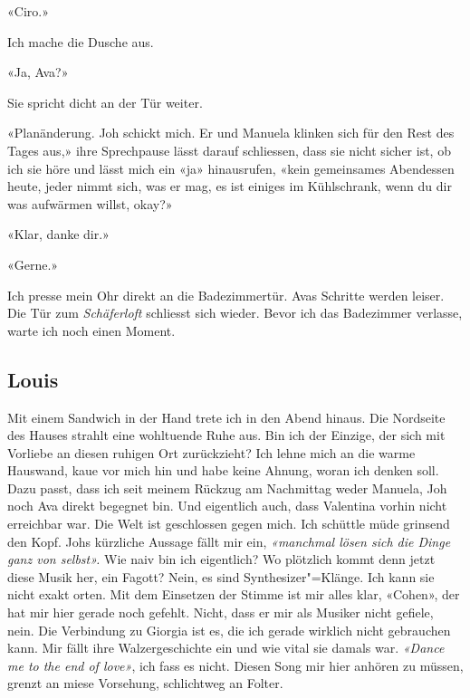 «Ciro.»

Ich mache die Dusche aus.

«Ja, Ava?»

Sie spricht dicht an der Tür weiter.

«Planänderung. Joh schickt mich. Er und Manuela klinken sich für den
Rest des Tages aus,» ihre Sprechpause lässt darauf schliessen, dass sie
nicht sicher ist, ob ich sie höre und lässt mich ein «ja» hinausrufen,
«kein gemeinsames Abendessen heute, jeder nimmt sich, was er mag, es ist
einiges im Kühlschrank, wenn du dir was aufwärmen willst, okay?»

«Klar, danke dir.»

«Gerne.»

Ich presse mein Ohr direkt an die Badezimmertür. Avas Schritte werden leiser.
Die Tür zum \emph{Schäferloft} schliesst sich wieder. Bevor ich das
Badezimmer verlasse, warte ich noch einen Moment.

\subsection{Louis}

Mit einem Sandwich in der Hand trete ich in den Abend hinaus. Die Nordseite des Hauses strahlt eine wohltuende Ruhe aus. 
Bin ich der Einzige, der sich mit Vorliebe an diesen ruhigen Ort zurückzieht?
Ich lehne mich an die warme Hauswand, kaue vor mich hin und habe keine
Ahnung, woran ich denken soll. Dazu passt, dass ich seit meinem Rückzug
am Nachmittag weder Manuela, Joh noch Ava direkt begegnet bin. Und
eigentlich auch, dass Valentina vorhin nicht erreichbar war. Die Welt
ist geschlossen gegen mich. Ich schüttle müde grinsend den Kopf. Johs kürzliche Aussage fällt mir ein,
\emph{«manchmal lösen sich die Dinge ganz von selbst».} Wie naiv bin ich
eigentlich?
Wo plötzlich kommt denn jetzt diese Musik her, ein Fagott? Nein, es sind
Syn\-the\-si\-zer"=Klänge. Ich kann sie nicht exakt orten. Mit dem Einsetzen
der Stimme ist mir alles klar, «Cohen», der hat mir hier gerade
noch gefehlt. Nicht, dass er mir als Musiker nicht gefiele, nein. Die
Verbindung zu Giorgia ist es, die ich gerade wirklich nicht gebrauchen
kann. Mir fällt ihre Walzergeschichte ein und wie vital sie damals war.
\emph{«Dance me to the end of love»}, ich fass es nicht. Diesen Song
mir hier anhören zu müssen, grenzt an miese Vorsehung, schlichtweg an
Folter.



